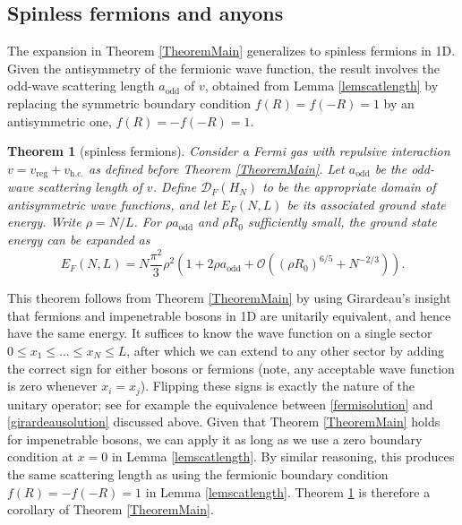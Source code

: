 \documentclass[a4paper,11pt]{article}
\newtheorem{theorem}{Theorem}
\numberwithin{equation}{section}
\begin{document}
\subsection{Spinless fermions and anyons}
\label{SecOthersymmetries}
The expansion in Theorem \ref{TheoremMain} generalizes to spinless fermions in 1D. Given the antisymmetry of the fermionic wave function, the result involves the odd-wave scattering length $a_{\text{odd}}$ of $v$, obtained from Lemma \ref{lemscatlength} by replacing the symmetric boundary condition $f(R)=f(-R)=1$ by an antisymmetric one, $f(R)=-f(-R)=1$.
\begin{theorem}[spinless fermions]\label{TheoremFermion}
Consider a Fermi gas with repulsive interaction  $v=v_{\text{reg}}+v_{\text{h.c.}}$ as defined before Theorem \ref{TheoremMain}. Let  $a_{\text{odd}}$ be the odd-wave scattering length of $v$. Define $\mathcal{D}_F(H_N)$ to be the appropriate domain of antisymmetric wave functions, and let $ E_F(N,L)$ be its associated ground state energy. Write $\rho=N/L$. For $\rho a_{\text{odd}}$ and $\rho R_0$ sufficiently small, the ground state energy can be expanded as 
\begin{equation}
E_F(N,L)=N\frac{\pi^2}{3}\rho^2\left(1+2\rho a_{\text{odd}}+\mathcal{O}\left(\left(\rho R_0\right)^{6/5}+N^{-2/3}\right)\right).
\end{equation}
\end{theorem}

This theorem follows from Theorem \ref{TheoremMain} by using Girardeau's insight \cite{girardeau1960relationship} that fermions and impenetrable bosons in 1D are unitarily equivalent, and hence have the same energy. It suffices to know the wave function on a single sector $0\leq x_1\leq \dots\leq x_N\leq L$, after which we can extend to any other sector by adding the correct sign for either bosons or fermions (note, any acceptable wave function is zero whenever $x_i=x_j$). Flipping these signs is exactly the nature of the unitary operator; see for example the equivalence between \eqref{fermisolution} and \eqref{girardeausolution} discussed above. Given that Theorem \ref{TheoremMain} holds for impenetrable bosons, we can apply it as long as we use a zero boundary condition at $x=0$ in Lemma \ref{lemscatlength}. By similar reasoning, this produces the same scattering length as using the fermionic boundary condition $f(R)=-f(-R)=1$ in Lemma \ref{lemscatlength}. Theorem \ref{TheoremFermion} is therefore a corollary of Theorem \ref{TheoremMain}.
\end{document}
